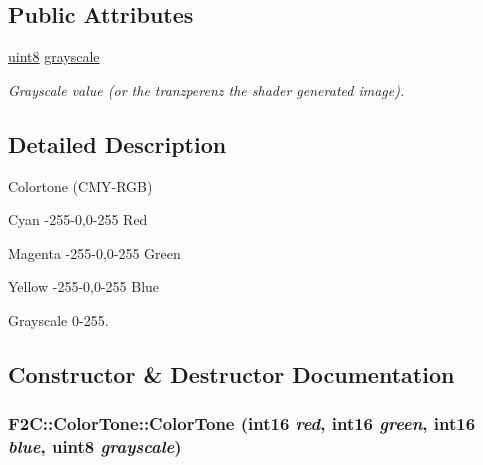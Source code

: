 \subsection*{Public Attributes}
\begin{DoxyCompactItemize}
\item 
\hypertarget{class_f2_c_1_1_color_tone_a563a24af834bcd125e75b69d72b4352d}{
\hyperlink{namespace_f2_c_a711deb33697d145669b9c0c4fe87c7ca}{uint8} \hyperlink{class_f2_c_1_1_color_tone_a563a24af834bcd125e75b69d72b4352d}{grayscale}}
\label{class_f2_c_1_1_color_tone_a563a24af834bcd125e75b69d72b4352d}

\begin{DoxyCompactList}\small\item\em Grayscale value (or the tranzperenz the shader generated image). \item\end{DoxyCompactList}\end{DoxyCompactItemize}


\subsection{Detailed Description}
Colortone (CMY-\/RGB) \par
 Cyan -\/255-\/0,0-\/255 Red \par
 Magenta -\/255-\/0,0-\/255 Green \par
 Yellow -\/255-\/0,0-\/255 Blue \par
 Grayscale 0-\/255. 

\subsection{Constructor \& Destructor Documentation}
\hypertarget{class_f2_c_1_1_color_tone_a89d4963f269e7bfb95cd9200407e8cb7}{
\subsubsection[{ColorTone}]{\setlength{\rightskip}{0pt plus 5cm}F2C::ColorTone::ColorTone ({\bf int16} {\em red}, \/  {\bf int16} {\em green}, \/  {\bf int16} {\em blue}, \/  {\bf uint8} {\em grayscale})}}
\label{class_f2_c_1_1_color_tone_a89d4963f269e7bfb95cd9200407e8cb7}


